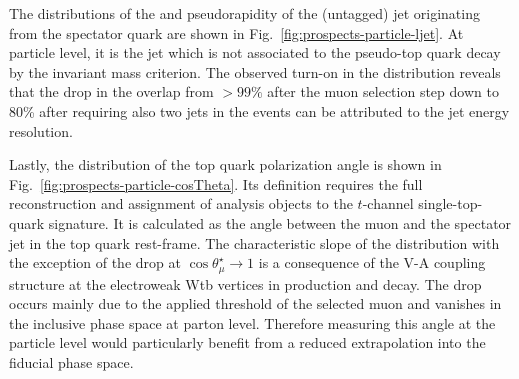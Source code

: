 The distributions of the \pt and pseudorapidity of the (untagged) jet originating from the spectator quark are shown in Fig.~\ref{fig:prospects-particle-ljet}. 
At particle level, it is the jet which is not associated to the pseudo-top quark decay by the invariant mass criterion. 
The observed turn-on in the \pt distribution reveals that the drop in the overlap from $>99\%$ after the muon selection step down to 80\% after requiring 
also two jets in the events can be attributed to the jet energy resolution.



Lastly, the distribution of the top quark polarization angle is shown in Fig.~\ref{fig:prospects-particle-cosTheta}. 
Its definition requires the full reconstruction and assignment of analysis objects to the $t$-channel single-top-quark signature. 
It is calculated as the angle between the muon and the spectator jet in the top quark rest-frame. 
The characteristic slope of the distribution with the exception of the drop at $\cos\theta_{\mu}^\star\to1$ is a consequence of the 
V-A coupling structure at the  electroweak Wtb vertices in production and decay. 
The drop occurs mainly due to the applied \pt threshold of the selected muon and vanishes in the inclusive phase space at parton level. 
Therefore measuring this angle at the particle level would particularly benefit from a reduced extrapolation into the fiducial phase space.



